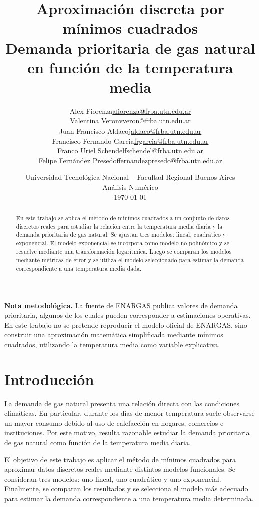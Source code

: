 \documentclass[12pt,a4paper]{article}
\title{
    \vspace{-1cm}
    \textbf{\Large Aproximación discreta por mínimos cuadrados}\\[0.3cm]
    \large Demanda prioritaria de gas natural en función de la temperatura media
}
\author{
\begin{tabular}{ll}
Alex Fiorenza & \href{mailto:afiorenza@frba.utn.edu.ar}{afiorenza@frba.utn.edu.ar}\\
Valentina Veron & \href{mailto:vveron@frba.utn.edu.ar}{vveron@frba.utn.edu.ar}\\
Juan Francisco Aldaco & \href{mailto:jaldaco@frba.utn.edu.ar}{jaldaco@frba.utn.edu.ar}\\
Francisco Fernando Garcia & \href{mailto:frgarcia@frba.utn.edu.ar}{frgarcia@frba.utn.edu.ar}\\
Franco Uriel Schendel & \href{mailto:fschendel@frba.utn.edu.ar}{fschendel@frba.utn.edu.ar}\\
Felipe Fernández Presedo & \href{mailto:ffernandezpresedo@frba.utn.edu.ar}{ffernandezpresedo@frba.utn.edu.ar}
\end{tabular}
}
\date{
    Universidad Tecnológica Nacional -- Facultad Regional Buenos Aires\\
    Análisis Numérico\\
    \today
}
\begin{document}
\maketitle

\begin{abstract}
En este trabajo se aplica el método de mínimos cuadrados a un conjunto de datos discretos reales para estudiar la relación entre la temperatura media diaria y la demanda prioritaria de gas natural. Se ajustan tres modelos: lineal, cuadrático y exponencial. El modelo exponencial se incorpora como modelo no polinómico y se resuelve mediante una transformación logarítmica. Luego se comparan los modelos mediante métricas de error y se utiliza el modelo seleccionado para estimar la demanda correspondiente a una temperatura media dada.
\end{abstract}

\begin{importantbox}
\textbf{Nota metodológica.} La fuente de ENARGAS publica valores de demanda prioritaria, algunos de los cuales pueden corresponder a estimaciones operativas. En este trabajo no se pretende reproducir el modelo oficial de ENARGAS, sino construir una aproximación matemática simplificada mediante mínimos cuadrados, utilizando la temperatura media como variable explicativa.
\end{importantbox}

\tableofcontents
\newpage

\section{Introducción}

La demanda de gas natural presenta una relación directa con las condiciones climáticas. En particular, durante los días de menor temperatura suele observarse un mayor consumo debido al uso de calefacción en hogares, comercios e instituciones. Por este motivo, resulta razonable estudiar la demanda prioritaria de gas natural como función de la temperatura media diaria.

El objetivo de este trabajo es aplicar el método de mínimos cuadrados para aproximar datos discretos reales mediante distintos modelos funcionales. Se consideran tres modelos: uno lineal, uno cuadrático y uno exponencial. Finalmente, se comparan los resultados y se selecciona el modelo más adecuado para estimar la demanda correspondiente a una temperatura media determinada.
\end{document}
